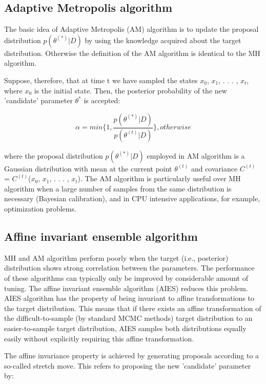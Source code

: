 \documentclass[11pt]{article}
\begin{document}
\subsection{Adaptive Metropolis algorithm}

The basic idea of Adaptive Metropolis (AM) algorithm is to update the proposal distribution $p(\theta^{(*)}|D)$ by using the knowledge  acquired about the target distribution. Otherwise the definition of the AM algorithm is identical to the MH algorithm.

Suppose, therefore, that at time t we have sampled the states $x_{0}$, $x_{1}$, . . . , $x_{t}$, where $x_{0}$ is the initial state. Then, the posterior probability of the new 'candidate' parameter $\theta^{*}$ is accepted:

\begin{equation*}
        \alpha = min \bigg\{1, \frac{p(\theta^{(*)}|D)}{p(\theta^{(t)}|D)}\bigg\}, otherwise 
    \end{equation*}

\noindent where the proposal distribution $p(\theta^{(*)}|D)$ employed in AM algorithm is a Gaussian distribution with mean at the current point $\theta^{(t)}$ and covariance $C^{(t)}$ = $C^{(t)}$($x_{0}$, $x_{1}$, . . . , $x_{t}$). The AM algorithm is particularly useful over MH algorithm when a large number of samples from the same distribution is necessary (Bayesian calibration), and in CPU intensive applications, for example, optimization problems.


\subsection{Affine invariant ensemble algorithm}

MH and AM algorithm perform poorly when the target (i.e., posterior) distribution shows
strong correlation between the parameters. The performance of these algorithms can typically only be improved by considerable amount of tuning. The affine invariant ensemble algorithm (AIES)  reduces this problem. AIES algorithm has the property of being invariant to affine transformations to the target distribution. This means that if there exists an affine transformation of the difficult-to-sample
(by standard MCMC methods) target distribution to an easier-to-sample target distribution,
AIES samples both distributions equally easily without explicitly requiring this affine transformation.

The affine invariance property is achieved by generating proposals according to a so-called stretch move. This refers to proposing the new 'candidate' parameter by:
\end{document}
